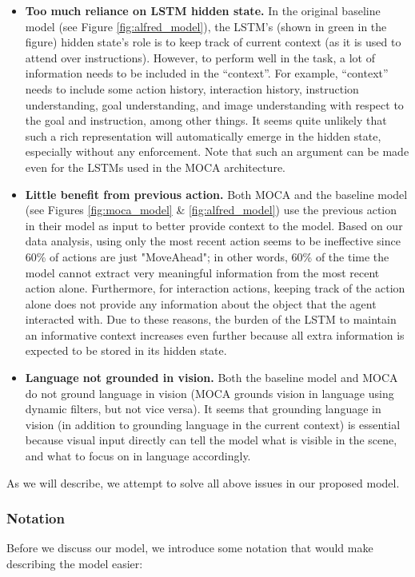 \documentclass[11pt,a4paper]{article}
\begin{document}
\begin{itemize}
    \item \textbf{Too much reliance on LSTM hidden state.} In the original baseline model \cite{shridhar2020alfred} (see Figure \ref{fig:alfred_model}), the LSTM's (shown in green in the figure) hidden state's role is to keep track of current context (as it is used to attend over instructions). However, to perform well in the task, a lot of information needs to be included in the ``context''. For example, ``context'' needs to include some action history, interaction history, instruction understanding, goal understanding, and image understanding with respect to the goal and instruction, among other things. It seems quite unlikely that such a rich representation will automatically emerge in the hidden state, especially without any enforcement. Note that such an argument can be made even for the LSTMs used in the MOCA \cite{singh2020moca} architecture.
    \item \textbf{Little benefit from previous action.} Both MOCA \cite{singh2020moca} and the baseline model \cite{shridhar2020alfred} (see Figures \ref{fig:moca_model} \& \ref{fig:alfred_model}) use the previous action in their model as input to better provide context to the model.  Based on our data analysis, using only the most recent action seems to be ineffective since 60\% of actions are just "MoveAhead"; in other words, 60\% of the time the model cannot extract very meaningful information from the most recent action alone. Furthermore, for interaction actions, keeping track of the action alone does not provide any information about the object that the agent interacted with. Due to these reasons, the burden of the LSTM to maintain an informative context increases even further because all extra information is expected to be stored in its hidden state.
    \item \textbf{Language not grounded in vision.} Both the baseline model and MOCA do not ground language in vision (MOCA grounds vision in language using dynamic filters, but not vice versa). It seems that grounding language in vision (in addition to grounding language in the current context) is essential because visual input directly can tell the model what is visible in the scene, and what to focus on in language accordingly.
\end{itemize}

As we will describe, we attempt to solve all above issues in our proposed model.

\subsubsection{Notation}
\label{sssec:notation}
Before we discuss our model, we introduce some notation that would make describing the model easier:
\end{document}
